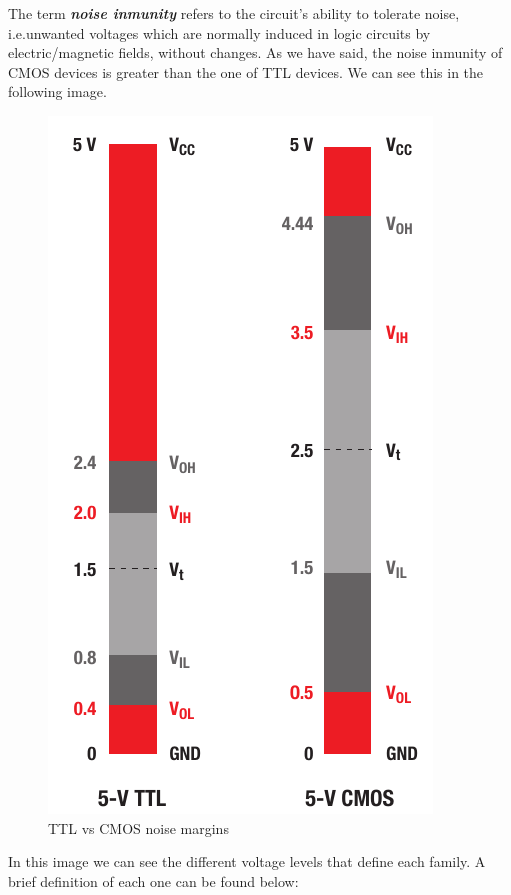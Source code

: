 The term \textbf{\textit{noise inmunity}} refers to the circuit's ability to tolerate noise, i.e.unwanted voltages which are normally induced in logic circuits by electric/magnetic fields, without changes. As we have said, the noise inmunity of CMOS devices is greater than the one of TTL devices. We can see this in the following image. \medskip


\begin{figure}[H]
    \centering
    \includegraphics[scale = 0.8]{Graphics/VHDL/Practice 8/TTL_VS_CMOS.pdf}
    \caption{TTL vs CMOS noise margins~\autocite{LOGIC_GUIDE}}
    \label{fig:TTL_VS_CMOS}
\end{figure}

In this image we can see the different voltage levels that define each family. A brief definition of each one can be found below:

